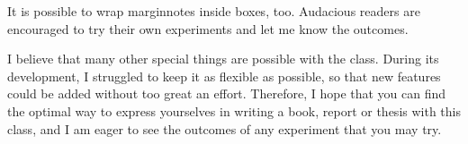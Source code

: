 It is possible to wrap marginnotes inside boxes, too. Audacious readers 
are encouraged to try their own experiments and let me know the 
outcomes.


I believe that many other special things are possible with the 
 class. During its development, I struggled to keep it as 
flexible as possible, so that new features could be added without too 
great an effort. Therefore, I hope that you can find the optimal way to 
express yourselves in writing a book, report or thesis with this class, 
and I am eager to see the outcomes of any experiment that you may try.

